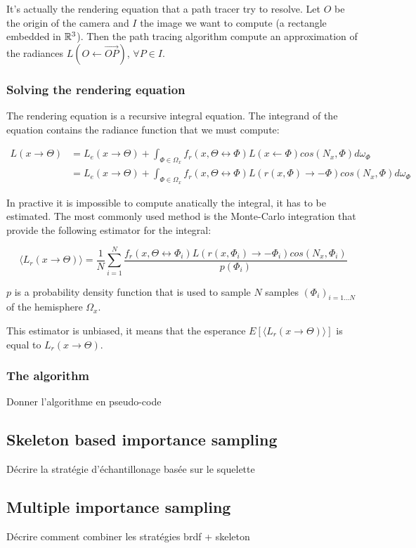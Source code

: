 It's actually the rendering equation that a path tracer try to resolve. Let $O$ be the origin of the camera and $I$ the image we want to compute (a rectangle embedded in $\mathbb{R}^3$). Then the path tracing algorithm compute an approximation of the radiances $L(O \leftarrow \vec{OP})$, $\forall P \in I$.

\subsubsection{Solving the rendering equation}

The rendering equation is a recursive integral equation. The integrand of the equation contains the radiance function that we must compute:

\begin{align*}
L(x \rightarrow \Theta) &= L_e(x \rightarrow \Theta) + \int_{\Phi \in \Omega_x} f_r(x, \Theta \leftrightarrow \Phi) L(x \leftarrow \Phi) cos(N_x, \Phi) d\omega_\Phi \\
&= L_e(x \rightarrow \Theta) + \int_{\Phi \in \Omega_x} f_r(x, \Theta \leftrightarrow \Phi) L(r(x, \Phi) \rightarrow -\Phi) cos(N_x, \Phi) d\omega_\Phi
\end{align*}

In practive it is impossible to compute anatically the integral, it has to be estimated. The most commonly used method is the Monte-Carlo integration that provide the following estimator for the integral:

\begin{equation*}
\langle L_r(x \rightarrow \Theta) \rangle = \frac{1}{N} \sum_{i = 1}^{N} \frac{f_r(x, \Theta \leftrightarrow \Phi_i) L(r(x, \Phi_i) \rightarrow -\Phi_i) cos(N_x, \Phi_i)}{p(\Phi_i)}
\end{equation*}

$p$ is a probability density function that is used to sample $N$ samples $(\Phi_i)_{i = 1...N}$ of the hemisphere $\Omega_x$.

This estimator is unbiased, it means that the esperance $E[\langle L_r(x \rightarrow \Theta) \rangle]$ is equal to $L_r(x \rightarrow \Theta)$. 


\subsubsection{The algorithm}

Donner l'algorithme en pseudo-code

\subsection{Skeleton based importance sampling}

Décrire la stratégie d'échantillonage basée sur le squelette

\subsection{Multiple importance sampling}

Décrire comment combiner les stratégies brdf + skeleton
